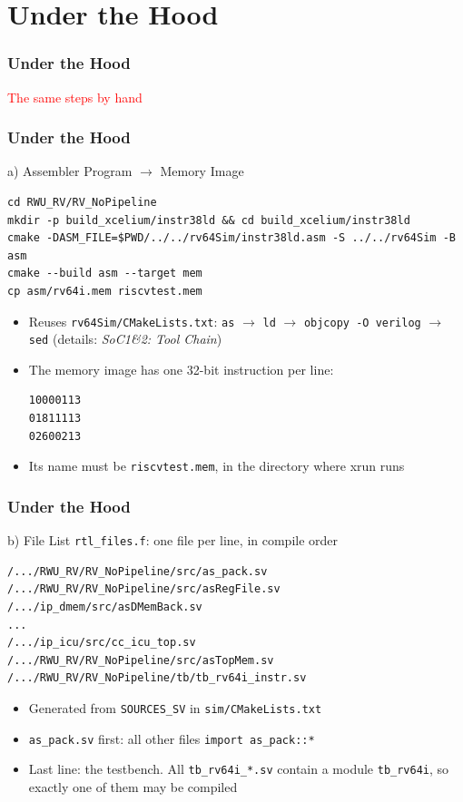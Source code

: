 \documentclass{beamer}
\newcommand{\astitle}{nix}
\newcommand{\assubtitle}{nix}
\newcommand{\cmd}[1]{\texttt{#1}}
\begin{document}
\section{Under the Hood}
\renewcommand{\astitle}{Under the Hood}
\begin{frame}
\frametitle{\astitle}
\textcolor{red}{The same steps by hand}
\end{frame}

\renewcommand{\assubtitle}{a) Assembler Program $\rightarrow$ Memory Image}
\begin{frame}[fragile]
\frametitle{\astitle}
\begin{block}{\assubtitle}
\begin{lstlisting}[style=sh]
cd RWU_RV/RV_NoPipeline
mkdir -p build_xcelium/instr38ld && cd build_xcelium/instr38ld
cmake -DASM_FILE=$PWD/../../rv64Sim/instr38ld.asm -S ../../rv64Sim -B asm
cmake --build asm --target mem
cp asm/rv64i.mem riscvtest.mem
\end{lstlisting}
  \begin{itemize}
    \item Reuses \cmd{rv64Sim/CMakeLists.txt}: \cmd{as} $\rightarrow$ \cmd{ld} $\rightarrow$
      \cmd{objcopy -O verilog} $\rightarrow$ \cmd{sed}
      (details: \emph{SoC1\&2: Tool Chain})
    \item The memory image has one 32-bit instruction per line:
\begin{lstlisting}
10000113
01811113
02600213
\end{lstlisting}
    \item Its name must be \cmd{riscvtest.mem}, in the directory where xrun runs
  \end{itemize}
\end{block}
\end{frame}

\renewcommand{\assubtitle}{b) File List}
\begin{frame}[fragile]
\frametitle{\astitle}
\begin{block}{\assubtitle}
  \cmd{rtl\_files.f}: one file per line, in compile order
\begin{lstlisting}
/.../RWU_RV/RV_NoPipeline/src/as_pack.sv
/.../RWU_RV/RV_NoPipeline/src/asRegFile.sv
/.../ip_dmem/src/asDMemBack.sv
...
/.../ip_icu/src/cc_icu_top.sv
/.../RWU_RV/RV_NoPipeline/src/asTopMem.sv
/.../RWU_RV/RV_NoPipeline/tb/tb_rv64i_instr.sv
\end{lstlisting}
  \begin{itemize}
    \item Generated from \cmd{SOURCES\_SV} in \cmd{sim/CMakeLists.txt}
    \item \cmd{as\_pack.sv} first: all other files \cmd{import as\_pack::*}
    \item Last line: the testbench. All \cmd{tb\_rv64i\_*.sv} contain a module
      \cmd{tb\_rv64i}, so exactly one of them may be compiled
  \end{itemize}
\end{block}
\end{frame}
\end{document}
